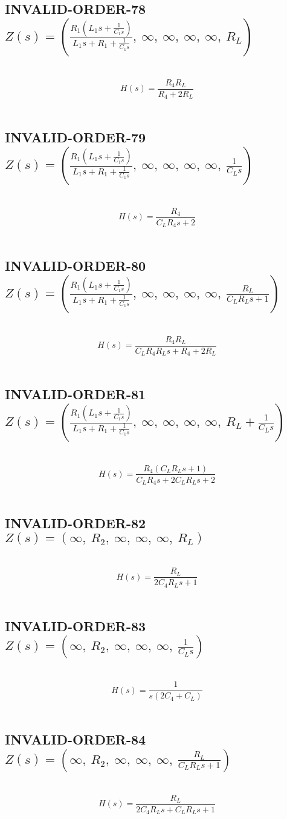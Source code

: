 \documentclass{article}
\begin{document}
\subsection{INVALID-ORDER-78 $Z(s) = \left( \frac{R_{1} \left(L_{1} s + \frac{1}{C_{1} s}\right)}{L_{1} s + R_{1} + \frac{1}{C_{1} s}}, \  \infty, \  \infty, \  \infty, \  \infty, \  R_{L}\right)$ } \ 
\textbf{\[H(s) = \frac{R_{4} R_{L}}{R_{4} + 2 R_{L}}\] } \ 
\subsection{INVALID-ORDER-79 $Z(s) = \left( \frac{R_{1} \left(L_{1} s + \frac{1}{C_{1} s}\right)}{L_{1} s + R_{1} + \frac{1}{C_{1} s}}, \  \infty, \  \infty, \  \infty, \  \infty, \  \frac{1}{C_{L} s}\right)$ } \ 
\textbf{\[H(s) = \frac{R_{4}}{C_{L} R_{4} s + 2}\] } \ 
\subsection{INVALID-ORDER-80 $Z(s) = \left( \frac{R_{1} \left(L_{1} s + \frac{1}{C_{1} s}\right)}{L_{1} s + R_{1} + \frac{1}{C_{1} s}}, \  \infty, \  \infty, \  \infty, \  \infty, \  \frac{R_{L}}{C_{L} R_{L} s + 1}\right)$ } \ 
\textbf{\[H(s) = \frac{R_{4} R_{L}}{C_{L} R_{4} R_{L} s + R_{4} + 2 R_{L}}\] } \ 
\subsection{INVALID-ORDER-81 $Z(s) = \left( \frac{R_{1} \left(L_{1} s + \frac{1}{C_{1} s}\right)}{L_{1} s + R_{1} + \frac{1}{C_{1} s}}, \  \infty, \  \infty, \  \infty, \  \infty, \  R_{L} + \frac{1}{C_{L} s}\right)$ } \ 
\textbf{\[H(s) = \frac{R_{4} \left(C_{L} R_{L} s + 1\right)}{C_{L} R_{4} s + 2 C_{L} R_{L} s + 2}\] } \ 
\subsection{INVALID-ORDER-82 $Z(s) = \left( \infty, \  R_{2}, \  \infty, \  \infty, \  \infty, \  R_{L}\right)$ } \ 
\textbf{\[H(s) = \frac{R_{L}}{2 C_{4} R_{L} s + 1}\] } \ 
\subsection{INVALID-ORDER-83 $Z(s) = \left( \infty, \  R_{2}, \  \infty, \  \infty, \  \infty, \  \frac{1}{C_{L} s}\right)$ } \ 
\textbf{\[H(s) = \frac{1}{s \left(2 C_{4} + C_{L}\right)}\] } \ 
\subsection{INVALID-ORDER-84 $Z(s) = \left( \infty, \  R_{2}, \  \infty, \  \infty, \  \infty, \  \frac{R_{L}}{C_{L} R_{L} s + 1}\right)$ } \ 
\textbf{\[H(s) = \frac{R_{L}}{2 C_{4} R_{L} s + C_{L} R_{L} s + 1}\] } \ 
\end{document}
